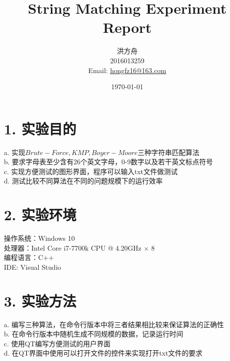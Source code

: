 \documentclass{article}
\title{String Matching Experiment Report}
\author{洪方舟\\2016013259\\Email: \href{mailto:hongfz16@163.com}{hongfz16@163.com}}
\date{\today}
\begin{document}
  \maketitle
  \setlength\parindent{0em}
  \section*{1. 实验目的}
  a. 实现$Brute-Force, KMP, Boyer-Moore$三种字符串匹配算法\\
  b. 要求字母表至少含有26个英文字母，0-9数字以及若干英文标点符号\\
  c. 实现方便测试的图形界面，程序可以输入txt文件做测试\\
  d. 测试比较不同算法在不同的问题规模下的运行效率
  \section*{2. 实验环境}
  操作系统：Windows 10\\
  处理器：Intel Core i7-7700k CPU @ 4.20GHz $\times$ 8\\
  编程语言：C++\\
  IDE: Visual Studio
  \section*{3. 实验方法}
  a. 编写三种算法，在命令行版本中将三者结果相比较来保证算法的正确性\\
  b. 在命令行版本中随机生成不同规模的数据，记录运行时间\\
  c. 使用QT编写方便测试的用户界面\\
  d. 在QT界面中使用可以打开文件的控件来实现打开txt文件的要求
  \newpage
\end{document}
